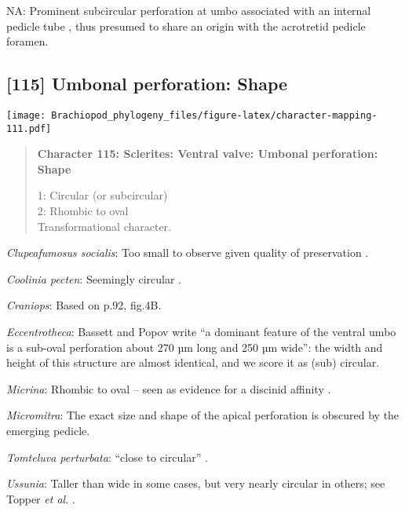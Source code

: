 \documentclass[openany]{book}
\theoremstyle{definition}
\theoremstyle{definition}
\theoremstyle{definition}
\theoremstyle{remark}
\begin{document}
\hypertarget{NA-coding-114}{}
NA: Prominent subcircular perforation at umbo associated with an
internal pedicle tube \citep{Popov2009Earlyontogeny}, thus presumed to
share an origin with the acrotretid pedicle foramen.

\subsection*{{[}115{]} Umbonal perforation:
Shape}\label{umbonal-perforation-shape}

\texttt{[image: Brachiopod\_phylogeny\_files/figure-latex/character-mapping-111.pdf]}

\begin{quote}
\textbf{Character 115: Sclerites: Ventral valve: Umbonal perforation:
Shape}

1: Circular (or subcircular)\\
2: Rhombic to oval\\
Transformational character.
\end{quote}

\hypertarget{Clupeafumosus_socialis-coding-115}{}
\emph{Clupeafumosus socialis}: Too small to observe given quality of
preservation \citep{Holmer2006Aspinose}.

\hypertarget{Coolinia_pecten-coding-115}{}
\emph{Coolinia pecten}: Seemingly circular
\citep{Zhang2011Anobolellate}.

\hypertarget{Craniops-coding-115}{}
\emph{Craniops}: Based on p.92, fig.4B.

\hypertarget{Eccentrotheca-coding-115}{}
\emph{Eccentrotheca}: Bassett and Popov write ``a dominant feature of
the ventral umbo is a sub-oval perforation about 270 µm long and 250 µm
wide'': the width and height of this structure are almost identical, and
we score it as (sub) circular.

\hypertarget{Micrina-coding-115}{}
\emph{Micrina}: Rhombic to oval -- seen as evidence for a discinid
affinity \citep{Chen2007Reinterpretationof}.

\hypertarget{Micromitra-coding-115}{}
\emph{Micromitra}: The exact size and shape of the apical perforation is
obscured by the emerging pedicle.

\hypertarget{Tomteluva_perturbata-coding-115}{}
\emph{Tomteluva perturbata}: ``close to circular''
\citep{Holmer2018Evolutionarysignificance}.

\hypertarget{Ussunia-coding-115}{}
\emph{Ussunia}: Taller than wide in some cases, but very nearly circular
in others; see Topper \emph{et al}.
\citeyearpar{Topper2013Reappraisalof}.
\end{document}
